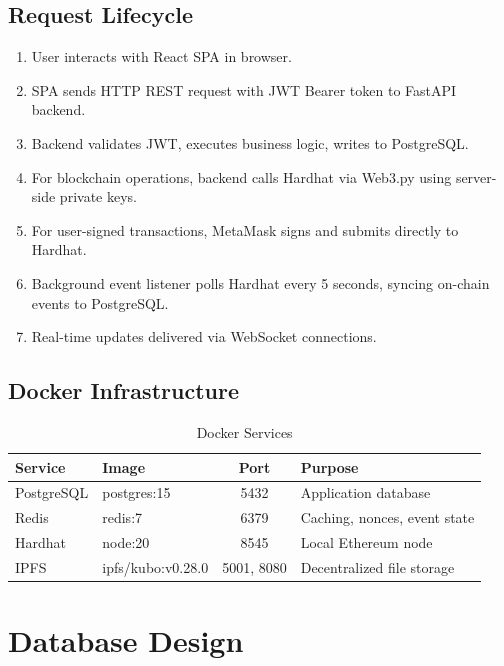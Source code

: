 \documentclass[12pt,a4paper]{article}
\begin{document}
\subsection{Request Lifecycle}
\begin{enumerate}[nosep]
    \item User interacts with React SPA in browser.
    \item SPA sends HTTP REST request with JWT Bearer token to FastAPI backend.
    \item Backend validates JWT, executes business logic, writes to PostgreSQL.
    \item For blockchain operations, backend calls Hardhat via Web3.py using server-side private keys.
    \item For user-signed transactions, MetaMask signs and submits directly to Hardhat.
    \item Background event listener polls Hardhat every 5 seconds, syncing on-chain events to PostgreSQL.
    \item Real-time updates delivered via WebSocket connections.
\end{enumerate}

\subsection{Docker Infrastructure}
\begin{table}[h]
\centering
\begin{tabular}{llcl}
\toprule
\textbf{Service} & \textbf{Image} & \textbf{Port} & \textbf{Purpose} \\
\midrule
PostgreSQL & postgres:15 & 5432 & Application database \\
Redis & redis:7 & 6379 & Caching, nonces, event state \\
Hardhat & node:20 & 8545 & Local Ethereum node \\
IPFS & ipfs/kubo:v0.28.0 & 5001, 8080 & Decentralized file storage \\
\bottomrule
\end{tabular}
\caption{Docker Services}
\end{table}

\section{Database Design}
\end{document}
